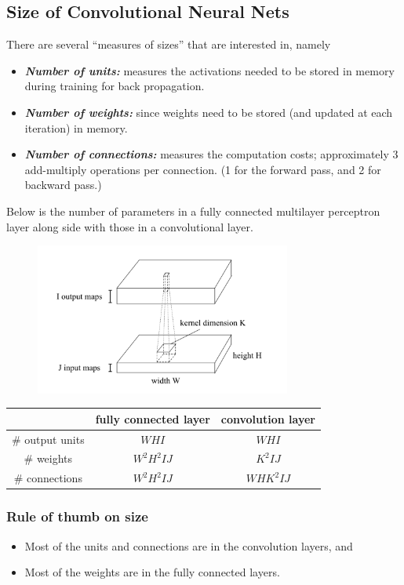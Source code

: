 \documentclass[11pt]{article}
\begin{document}
\subsection{Size of Convolutional Neural Nets}
There are several ``measures of sizes'' that are interested in, namely
\begin{itemize}
    \item \textit{\textbf{Number of units:}} measures the activations needed to be stored in memory during training for back propagation.
    \item \textit{\textbf{Number of weights:}} since weights need to be stored (and updated at each iteration) in memory. 
    \item \textit{\textbf{Number of connections:}} measures the computation costs; approximately 3 add-multiply operations per connection. (1 for the forward pass, and 2 for backward pass.)
\end{itemize}
Below is the number of parameters in a fully connected multilayer perceptron layer along side with those in a convolutional layer. \cite{convNetSize}
\begin{figure}[H]
    \center\includegraphics[width=0.75\textwidth]{img/size_conv_net}
\end{figure}
\begin{center}
    \begin{tabular}{c||c|c|}
        & fully connected layer & convolution layer \\
        \hline \hline
        \# output units & $WHI$ & $WHI$ \\
        \hline 
        \# weights & $W^2H^2IJ$ & $K^2IJ$ \\
        \hline
        \# connections & $W^2H^2IJ$ & $WHK^2IJ$ \\
        \hline
    \end{tabular}
\end{center}

\subsubsection{Rule of thumb on size}
\begin{itemize}
    \item Most of the units and connections are in the convolution layers, and
    \item Most of the weights are in the fully connected layers. 
\end{itemize}





















\newpage


\end{document}
